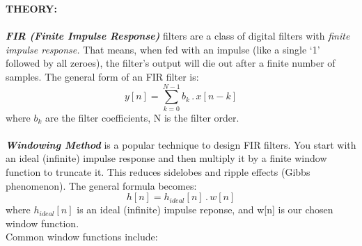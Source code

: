 \documentclass[12pt]{report}
\begin{document}
  \noindent \textbf{THEORY:} \\ \\
  \textbf{\textit{FIR (Finite Impulse Response)}} filters are a class of digital filters with \textit{finite impulse response.} That means, when fed with an impulse (like a single ‘1’ followed by all zeroes), the filter’s output will die out after a finite number of samples. The general form of an FIR filter is: \[ y[n] = \sum_{k = 0}^{N-1} b_k \, . \, x[n - k] \] where $b_k$ are the filter coefficients, N is the filter order. \cite{chatgpt} \\ \\
  \textbf{\textit{Windowing Method}} is a popular technique to design FIR filters. You start with an ideal (infinite) impulse response and then multiply it by a finite window function to truncate it. This reduces sidelobes and ripple effects (Gibbs phenomenon). The general formula becomes: \[ h[n] = h_{ideal} [n] \, . \, w[n] \] where $h_{ideal} [n]$ is an ideal (infinite) impulse reponse, and w[n] is our chosen window function. \\ Common window functions include:
\end{document}
